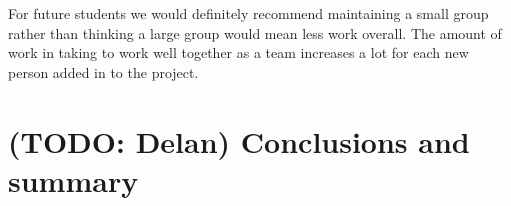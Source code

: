 \documentclass[a4paper,titlepage,12pt]{article}
\let\stdsection\section
\renewcommand\section{\newpage\stdsection}
\begin{document}
For future students we would definitely recommend maintaining a small group
rather than thinking a large group would mean less work overall. The amount of
work in taking to work well together as a team increases a lot for each new
person added in to the project.

\section{(TODO: Delan) Conclusions and summary}

\begin{sloppypar}
	\printbibliography
\end{sloppypar}
\end{document}

